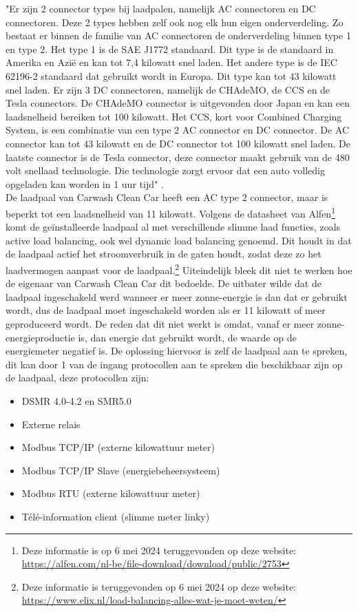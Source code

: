 "Er zijn 2 connector types bij laadpalen, namelijk AC connectoren en DC connectoren. Deze 2 types hebben zelf ook nog elk hun eigen onderverdeling. Zo bestaat er binnen de familie van AC connectoren de onderverdeling binnen type 1 en type 2. Het type 1 is de SAE J1772 standaard. Dit type is de standaard in Amerika en Azië en kan tot 7,4 kilowatt snel laden. Het andere type is de IEC 62196-2 standaard dat gebruikt wordt in Europa. Dit type kan tot 43 kilowatt snel laden. Er zijn 3 DC connectoren, namelijk de CHAdeMO, de CCS en de Tesla connectors. De CHAdeMO connector is uitgevonden door Japan en kan een laadsnelheid bereiken tot 100 kilowatt. Het CCS, kort voor Combined Charging System, is een combinatie van een type 2 AC connector en DC connector. De AC connector kan tot 43 kilowatt en de DC connector tot 100 kilowatt snel laden. De laatste connector is de Tesla connector, deze connector maakt gebruik van de 480 volt snellaad technologie. Die technologie zorgt ervoor dat een auto volledig opgeladen kan worden in 1 uur tijd" \autocite{HEMAVATHI2022}. \\

De laadpaal van Carwash Clean Car heeft een AC type 2 connector, maar is beperkt tot een laadsnelheid van 11 kilowatt. Volgens de datasheet van Alfen\footnote{Deze informatie is op 6 mei 2024 teruggevonden op deze website: \url{https://alfen.com/nl-be/file-download/download/public/2753}} komt de geïnstalleerde laadpaal al met verschillende slimme laad functies, zoals active load balancing, ook wel dynamic load balancing genoemd. Dit houdt in dat de laadpaal actief het stroomverbruik in de gaten houdt, zodat deze zo het laadvermogen aanpast voor de laadpaal.\footnote{Deze informatie is teruggevonden op 6 mei 2024 op deze website: \url{https://www.elix.nl/load-balancing-alles-wat-je-moet-weten/}} Uiteindelijk bleek dit niet te werken hoe de eigenaar van Carwash Clean Car dit bedoelde. De uitbater wilde dat de laadpaal ingeschakeld werd wanneer er meer zonne-energie is dan dat er gebruikt wordt, dus de laadpaal moet ingeschakeld worden als er 11 kilowatt of meer geproduceerd wordt. De reden dat dit niet werkt is omdat, vanaf er meer zonne-energieproductie is, dan energie dat gebruikt wordt, de waarde op de energiemeter negatief is. De oplossing hiervoor is zelf de laadpaal aan te spreken, dit kan door 1 van de ingang protocollen aan te spreken die beschikbaar zijn op de laadpaal, deze protocollen zijn:

\begin{itemize}
    \item DSMR 4.0-4.2 en SMR5.0
    \item Externe relais
    \item Modbus TCP/IP (externe kilowattuur meter)
    \item Modbus TCP/IP Slave (energiebeheersysteem)
    \item Modbus RTU (externe kilowattuur meter)
    \item Télé-information client (slimme meter linky)
\end{itemize}

